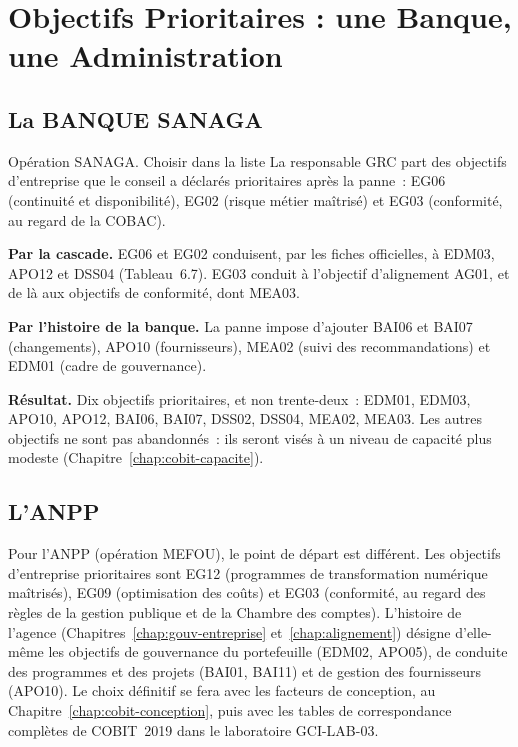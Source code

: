 \section{Objectifs Prioritaires : une Banque, une Administration}
\label{sec:c06-priorites}

\subsection{La BANQUE SANAGA}

\begin{boxscenario}{Opération SANAGA. Choisir dans la liste}
La responsable GRC part des objectifs d'entreprise que le conseil a
déclarés prioritaires après la panne~: EG06 (continuité et disponibilité),
EG02 (risque métier maîtrisé) et EG03 (conformité, au regard de la COBAC).

\medskip
\textbf{Par la cascade.} EG06 et EG02 conduisent, par les fiches
officielles, à EDM03, APO12 et DSS04 (Tableau~6.7). EG03 conduit à
l'objectif d'alignement AG01, et de là aux objectifs de conformité, dont
MEA03.

\medskip
\textbf{Par l'histoire de la banque.} La panne impose d'ajouter BAI06 et
BAI07 (changements), APO10 (fournisseurs), MEA02 (suivi des
recommandations) et EDM01 (cadre de gouvernance).

\medskip
\textbf{Résultat.} Dix objectifs prioritaires, et non trente-deux~: EDM01,
EDM03, APO10, APO12, BAI06, BAI07, DSS02, DSS04, MEA02, MEA03. Les autres
objectifs ne sont pas abandonnés~: ils seront visés à un niveau de
capacité plus modeste (Chapitre~\ref{chap:cobit-capacite}).
\end{boxscenario}

\subsection{L'ANPP}

Pour l'ANPP (opération MEFOU), le point de départ est différent. Les
objectifs d'entreprise prioritaires sont EG12 (programmes de
transformation numérique maîtrisés), EG09 (optimisation des coûts) et
EG03 (conformité, au regard des règles de la gestion publique et de la
Chambre des comptes). L'histoire de l'agence (Chapitres~\ref{chap:gouv-entreprise}
et~\ref{chap:alignement}) désigne d'elle-même les objectifs de
gouvernance du portefeuille (EDM02, APO05), de conduite des programmes et
des projets (BAI01, BAI11) et de gestion des fournisseurs (APO10). Le
choix définitif se fera avec les facteurs de conception, au
Chapitre~\ref{chap:cobit-conception}, puis avec les tables de
correspondance complètes de COBIT~2019 dans le laboratoire GCI-LAB-03.

